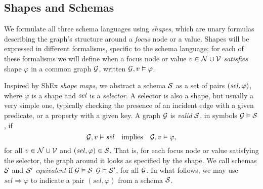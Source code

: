 \subsection{Shapes and Schemas}
\label{ssec:shapes}

We formulate all three schema languages using \emph{shapes}, which are unary
formulas describing the graph's structure around a \emph{focus} node or a value.
Shapes will be expressed in different formalisms, specific to the schema
language; for each of these formalisms we will define when a focus node or value
$v \in \mathcal{N} \cup \mathcal{V}$ \emph{satisfies} shape $\varphi$ in a common graph
$\mathcal{G}$, written $\mathcal{G}, v \vDash \varphi$.

Inspired by ShEx \emph{shape maps}, we abstract a schema $\mathcal{S}$ as a set of
pairs $(\mathit{sel},\varphi)$, where $\varphi$ is a shape and $\mathit{sel}$ is a
\emph{selector}.
A selector is also a shape, but usually a very simple one, typically checking
the presence of an incident edge with a given predicate, or a property with a
given key.
A graph $\mathcal{G}$ is \emph{valid} \wrt $\mathcal{S}$, in symbols $\mathcal{G} \vDash
\mathcal{S}$, if
\[
  \mathcal{G}, v \vDash \mathit{sel}
\quad \text{implies} \quad
  \mathcal{G}, v \vDash \varphi,
\]
for all $v \in \mathcal{N} \cup \mathcal{V}$ and $(\mathit{sel}, \varphi) \in \mathcal{S}$.
That is, for each focus node or value satisfying the selector, the graph around
it looks as specified by the shape.
We call schemas $\mathcal{S}$ and $\mathcal{S}'$ \emph{equivalent} if $\mathcal{G} \vDash
\mathcal{S}$ \iff $\mathcal{G} \vDash \mathcal{S}'$, for all $\mathcal{G}$.
In what follows, we may use $\mathit{sel} \Rightarrow \varphi$ to indicate a
pair $(\mathit{sel}, \varphi)$ from a schema $\mathcal{S}$.



